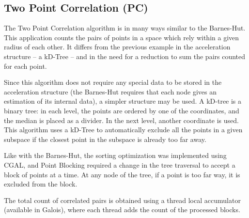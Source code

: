 \subsection{Two Point Correlation (PC)}
\label{sec:cases:pointcorr}

The Two Point Correlation algorithm is in many ways similar to the Barnes-Hut. This application counts the pairs of points in a space which rely within a given radius of each other. It differs from the previous example in the acceleration structure -- a kD-Tree -- and in the need for a reduction to sum the pairs counted for each point.

Since this algorithm does not require any special data to be stored in the acceleration structure (the Barnes-Hut requires that each node gives an estimation of its internal data), a simpler structure may be used. A kD-tree is a binary tree: in each level, the points are ordered by one of the coordinates, and the median is placed as a divider. In the next level, another coordinate is used. This algorithm uses a kD-Tree to automatically exclude all the points in a given subspace if the closest point in the subspace is already too far away.

Like with the Barnes-Hut, the sorting optimization was implemented using CGAL, and Point Blocking required a change in the tree traversal to accept a block of points at a time. At any node of the tree, if a point is too far way, it is excluded from the block.

The total count of correlated pairs is obtained using a thread local accumulator (available in Galois), where each thread adds the count of the processed blocks.